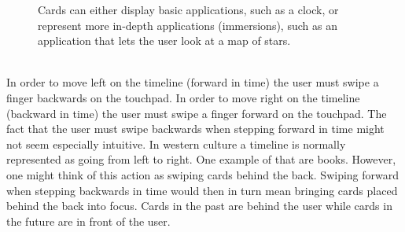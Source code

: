 	\begin{figure}[ht!]
		\centering
  	 \qquad
   	\qquad
   	\qquad
		\caption{Cards can either display basic applications, such as a clock, or represent more in-depth applications (immersions), such as an application that lets the user look at a map of stars.}
		\label{GoogleGlassCards}
	\end{figure}
\\
In order to move left on the timeline (forward in time) the user must swipe a finger backwards on the touchpad. In order to move right on the timeline (backward in time) the user must swipe a finger forward on the touchpad. The fact that the user must swipe backwards when stepping forward in time might not seem especially intuitive. In western culture a timeline is normally represented as going from left to right. One example of that are books. However, one might think of this action as swiping cards behind the back. Swiping forward when stepping backwards in time would then in turn mean bringing cards placed behind the back into focus. Cards in the past are behind the user while cards in the future are in front of the user.
